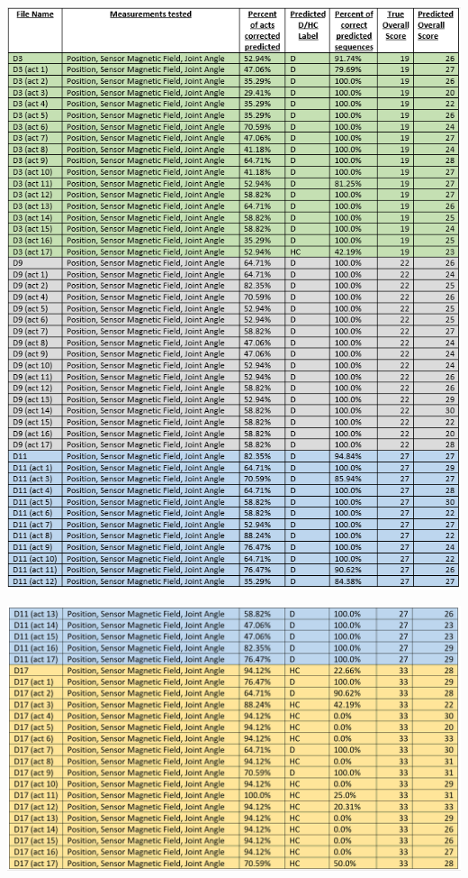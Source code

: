 \documentclass[12pt,twoside]{report}
\begin{document}
\begin{center}
\includegraphics[scale=0.85]{project_figures/fig11_9}
\end{center}

\begin{center}
\includegraphics[scale=0.4]{project_figures/fig11_10}
\end{center}
\end{document}
